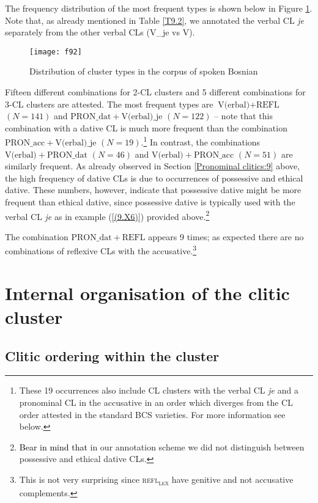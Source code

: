 The frequency distribution of the most frequent types is shown  below in Figure \ref{F9.2}. Note that, as already mentioned in Table \ref{T9.2}, we annotated the verbal CL \textit{je} separately from the other verbal CLs (V\_je vs V).

\begin{figure}
\caption{Distribution of cluster types in the corpus of spoken Bosnian}
\label{F9.2}
\texttt{[image: f92]}
\end{figure}

\largerpage
Fifteen different combinations for 2-CL clusters and 5 different combinations for 3-CL clusters are attested. The most frequent types are $\text{V(erbal)}+\text{REFL}$ $(N=141)$ and $\text{PRON}\_\text{dat}+\text{V(erbal)}\_\text{je}$ $(N=122)$ – note that this combination with a dative CL is much more frequent than the combination $\text{PRON}\_\text{acc}+\text{V(erbal)}\_\text{je}$ $(N=19)$.\footnote{These 19 occurrences also include CL clusters with the verbal CL \textit{je} and a pronominal CL in the accusative in an order which diverges from the CL order attested in the standard BCS varieties. For more information see below.} In contrast, the combinations $\text{V(erbal)}+\text{PRON}\_\text{dat}$ $(N=46)$ and  $\text{V(erbal)}+\text{PRON}\_\text{acc}$ $(N=51)$ are similarly frequent. As already observed in Section \ref{Pronominal clitics:9} above, the high frequency of dative CLs is due to occurrences of possessive and ethical dative. These numbers, however, indicate that possessive dative might be more frequent than ethical dative, since possessive dative is typically used with the verbal CL \textit{je} as in example (\ref{(9.X6)}) provided above.\footnote{\textcolor{black}{Bear in mind that} in our annotation scheme we did not distinguish between possessive and ethical dative CLs.} 

The combination $\text{PRON}\_\text{dat} + \text{REFL}$ appears 9 times; as expected there are no combinations of reflexive CLs with the accusative.\footnote{This is not very surprising since \textsc{refl\textsubscript{lex}} have genitive and not accusative complements.}

\section{Internal organisation of the clitic cluster}
\label{Internal organisation of the clitic cluster:9}
\subsection{Clitic ordering within the cluster}

